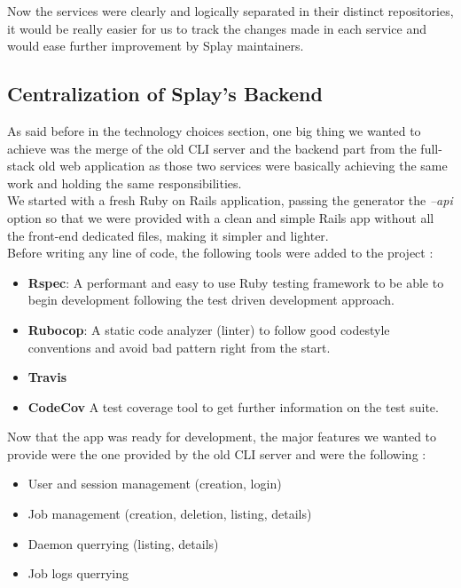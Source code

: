 \documentclass{eplmastersthesis}
\begin{document}
        Now the services were clearly and logically separated in their
        distinct repositories, it would be really easier for us to track
        the changes made in each service and would ease further improvement
        by Splay maintainers.

      \subsection{Centralization of Splay's Backend}

        As said before in the technology choices section, one big thing
        we wanted to achieve was the merge of the old CLI server and
        the backend part from the full-stack old web application as those two
        services were basically achieving the same work and holding the
        same responsibilities.\\

        We started with a fresh Ruby on Rails application, passing the
        generator the \textit{--api} option so that we were provided with
        a clean and simple Rails app without all the front-end dedicated
        files, making it simpler and lighter.\\

        Before writing any line of code, the following tools were added
        to the project :

        \begin{itemize}
          \item \textbf{Rspec}: A performant and easy to use Ruby testing
          framework to be able to begin development following the test
          driven development approach.
          \item \textbf{Rubocop}: A static code analyzer (linter) to follow
          good codestyle conventions and avoid bad pattern right from the start.
          \item \textbf{Travis}
          \item \textbf{CodeCov} A test coverage tool to get further
          information on the test suite.
        \end{itemize}

        Now that the app was ready for development, the major features
        we wanted to provide were the one provided by the old CLI server and
        were the following :

        \begin{itemize}
          \item User and session management (creation, login)
          \item Job management (creation, deletion, listing, details)
          \item Daemon querrying (listing, details)
          \item Job logs querrying
        \end{itemize}
\end{document}
